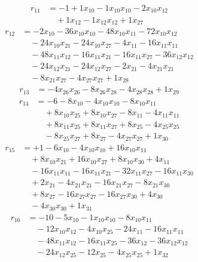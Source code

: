 \[\begin{aligned}
r_{11} &= - 1 + 1 x_{10} - 1 x_{10} x_{10} - 2 x_{10} x_{12} \\
 &\quad + 1 x_{12} - 1 x_{12} x_{12} + 1 x_{27}
\end{aligned}\]
\[\begin{aligned}
r_{12} &= - 2 x_{10} - 36 x_{10} x_{10} - 48 x_{10} x_{11} - 72 x_{10} x_{12} \\
 &\quad - 24 x_{10} x_{21} - 24 x_{10} x_{27} - 4 x_{11} - 16 x_{11} x_{11} \\
 &\quad - 48 x_{11} x_{12} - 16 x_{11} x_{21} - 16 x_{11} x_{27} - 36 x_{12} x_{12} \\
 &\quad - 24 x_{12} x_{21} - 24 x_{12} x_{27} - 2 x_{21} - 4 x_{21} x_{21} \\
 &\quad - 8 x_{21} x_{27} - 4 x_{27} x_{27} + 1 x_{28}
\end{aligned}\]
\[\begin{aligned}
r_{13} &= - 4 x_{26} x_{26} - 8 x_{26} x_{28} - 4 x_{28} x_{28} + 1 x_{29}
\end{aligned}\]
\[\begin{aligned}
r_{14} &= - 6 - 8 x_{10} - 4 x_{10} x_{10} - 8 x_{10} x_{11} \\
 &\quad + 8 x_{10} x_{25} + 8 x_{10} x_{27} - 8 x_{11} - 4 x_{11} x_{11} \\
 &\quad + 8 x_{11} x_{25} + 8 x_{11} x_{27} + 8 x_{25} - 4 x_{25} x_{25} \\
 &\quad - 8 x_{25} x_{27} + 8 x_{27} - 4 x_{27} x_{27} + 1 x_{30}
\end{aligned}\]
\[\begin{aligned}
r_{15} &= + 1 - 6 x_{10} - 4 x_{10} x_{10} + 16 x_{10} x_{11} \\
 &\quad + 8 x_{10} x_{21} + 16 x_{10} x_{27} + 8 x_{10} x_{30} + 4 x_{11} \\
 &\quad - 16 x_{11} x_{11} - 16 x_{11} x_{21} - 32 x_{11} x_{27} - 16 x_{11} x_{30} \\
 &\quad + 2 x_{21} - 4 x_{21} x_{21} - 16 x_{21} x_{27} - 8 x_{21} x_{30} \\
 &\quad + 8 x_{27} - 16 x_{27} x_{27} - 16 x_{27} x_{30} + 4 x_{30} \\
 &\quad - 4 x_{30} x_{30} + 1 x_{31}
\end{aligned}\]
\[\begin{aligned}
r_{16} &= - 10 - 5 x_{10} - 1 x_{10} x_{10} - 8 x_{10} x_{11} \\
 &\quad - 12 x_{10} x_{12} - 4 x_{10} x_{25} - 24 x_{11} - 16 x_{11} x_{11} \\
 &\quad - 48 x_{11} x_{12} - 16 x_{11} x_{25} - 36 x_{12} - 36 x_{12} x_{12} \\
 &\quad - 24 x_{12} x_{25} - 12 x_{25} - 4 x_{25} x_{25} + 1 x_{32}
\end{aligned}\]
